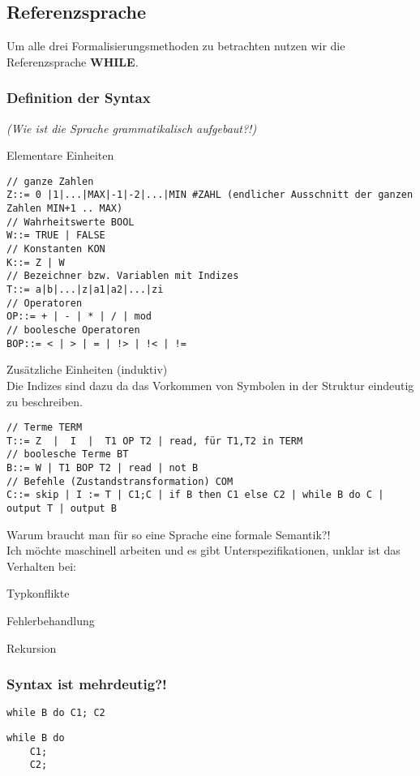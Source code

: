 \subsection{Referenzsprache}
Um alle drei Formalisierungsmethoden zu betrachten nutzen wir die Referenzsprache \textbf{WHILE}.
\subsubsection{Definition der Syntax}
\emph{(Wie ist die Sprache grammatikalisch aufgebaut?!)}
\begin{compactitem}
	\item Elementare Einheiten\\
	\begin{lstlisting}
// ganze Zahlen
Z::= 0 |1|...|MAX|-1|-2|...|MIN #ZAHL (endlicher Ausschnitt der ganzen Zahlen MIN+1 .. MAX)
// Wahrheitswerte BOOL
W::= TRUE | FALSE
// Konstanten KON
K::= Z | W
// Bezeichner bzw. Variablen mit Indizes
T::= a|b|...|z|a1|a2|...|zi
// Operatoren
OP::= + | - | * | / | mod
// boolesche Operatoren
BOP::= < | > | = | !> | !< | !=
	\end{lstlisting}
	\item Zusätzliche Einheiten (induktiv)\\
	Die Indizes sind dazu da das Vorkommen von Symbolen in der Struktur eindeutig zu beschreiben.\\
	\begin{lstlisting}
// Terme TERM
T::= Z  |  I  |  T1 OP T2 | read, für T1,T2 in TERM
// boolesche Terme BT
B::= W | T1 BOP T2 | read | not B
// Befehle (Zustandstransformation) COM
C::= skip | I := T | C1;C | if B then C1 else C2 | while B do C |  output T | output B
	\end{lstlisting}
\end{compactitem}
Warum braucht man für so eine Sprache eine formale Semantik?!\\
Ich möchte maschinell arbeiten und es gibt Unterspezifikationen, unklar ist das Verhalten bei:
\begin{compactitem}
\item Typkonflikte\\
\item Fehlerbehandlung\\
\item Rekursion\\
\end{compactitem}

\subsubsection*{Syntax ist mehrdeutig?!}
\begin{lstlisting}
while B do C1; C2
\end{lstlisting}
\begin{lstlisting}
while B do 
	C1; 
	C2;
\end{lstlisting}






